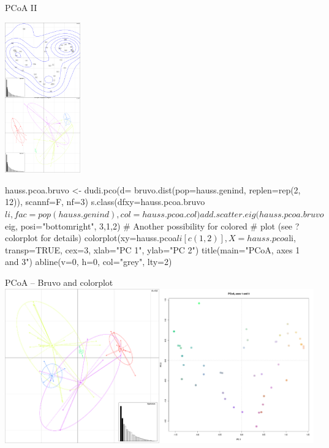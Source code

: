 \documentclass[compress, ucs, xelatex, 11pt, xcolor=svgnames,
  hyperref={
    bookmarks=true,
    unicode=true,
    colorlinks=true,
    pdftitle={Molecular data in R},
    plainpages=false,
    pdfauthor={Vojtech Zeisek},
    pdfsubject={Course about phylogeny and evolution in R},
    pdfcreator={XeLaTeX},
    pdfkeywords={R, evolution, phylogeny, molecular data},
    linkcolor=Tomato,
    anchorcolor=SaddleBrown,
    citecolor=Goldenrod,
    filecolor=DarkMagenta,
    menucolor=Sienna,
    urlcolor=DarkTurquoise,
    pdftex},
  url={hyphens, lowtilde} %
  ]{beamer}
\begin{document}
\begin{frame}[fragile]{PCoA II}
\begin{multicols}{2}
  \begin{center}
    \includegraphics[height=6.5cm]{pcoa.png}
  \end{center}
  \columnbreak
  \begin{spluscode}
    hauss.pcoa.bruvo <- dudi.pco(d=	
      bruvo.dist(pop=hauss.genind,
      replen=rep(2, 12)), scannf=F,
      nf=3)
    s.class(dfxy=hauss.pcoa.bruvo$li,
      fac=pop(hauss.genind),
      col=hauss.pcoa.col)
    add.scatter.eig(hauss.pcoa.bruvo$
      eig, posi="bottomright", 3,1,2)
    # Another possibility for colored
    # plot (see ?colorplot for details)
    colorplot(xy=hauss.pcoa$li[c(1, 2)],
      X=hauss.pcoa$li, transp=TRUE,
      cex=3, xlab="PC 1", ylab="PC 2")
    title(main="PCoA, axes 1 and 3")
    abline(v=0, h=0, col="grey", lty=2)
  \end{spluscode}
\end{multicols}
\end{frame}

\begin{frame}{PCoA -- Bruvo and colorplot}
  \includegraphics[width=\textwidth]{pcoa-dalsi.png}
\end{frame}
\end{document}

